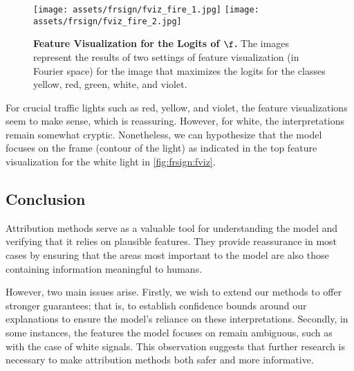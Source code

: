 \begin{figure}[ht]
\centering
\texttt{[image: assets/frsign/fviz\_fire\_1.jpg]}
\texttt{[image: assets/frsign/fviz\_fire\_2.jpg]}
\caption{\textbf{Feature Visualization for the Logits of $\f$.} The images represent the results of two settings of feature visualization (in Fourier space) for the image that maximizes the logits for the classes yellow, red, green, white, and violet.}
\label{fig:frsign:fviz}
\end{figure}

For crucial traffic lights such as red, yellow, and violet, the feature visualizations seem to make sense, which is reassuring. However, for white, the interpretations remain somewhat cryptic. Nonetheless, we can hypothesize that the model focuses on the frame (contour of the light) as indicated in the top feature visualization for the white light in \autoref{fig:frsign:fviz}.

\subsection{Conclusion}

Attribution methods serve as a valuable tool for understanding the model and verifying that it relies on plausible features. They provide reassurance in most cases by ensuring that the areas most important to the model are also those containing information meaningful to humans.

However, two main issues arise. Firstly, we wish to extend our methods to offer stronger guarantees; that is, to establish confidence bounds around our explanations to ensure the model's reliance on these interpretations. Secondly, in some instances, the features the model focuses on remain ambiguous, such as with the case of white signals. This observation suggests that further research is necessary to make attribution methods both safer and more informative.
